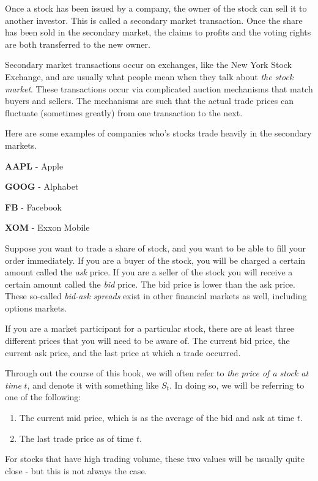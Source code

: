 \documentclass[11pt,]{krantz}
\begin{document}
Once a stock has been issued by a company, the owner of the stock can sell it to another investor. This is called a secondary market transaction. Once the share has been sold in the secondary market, the claims to profits and the voting rights are both transferred to the new owner.

Secondary market transactions occur on exchanges, like the New York Stock Exchange, and are usually what people mean when they talk about \emph{the stock market}. These transactions occur via complicated auction mechanisms that match buyers and sellers. The mechanisms are such that the actual trade prices can fluctuate (sometimes greatly) from one transaction to the next.

Here are some examples of companies who's stocks trade heavily in the secondary markets.

\textbf{AAPL} - Apple

\textbf{GOOG} - Alphabet

\textbf{FB} - Facebook

\textbf{XOM} - Exxon Mobile

Suppose you want to trade a share of stock, and you want to be able to fill your order immediately. If you are a buyer of the stock, you will be charged a certain amount called the \emph{ask} price. If you are a seller of the stock you will receive a certain amount called the \emph{bid} price. The bid price is lower than the ask price. These so-called \emph{bid-ask spreads} exist in other financial markets as well, including options markets.

If you are a market participant for a particular stock, there are at least three different prices that you will need to be aware of. The current bid price, the current ask price, and the last price at which a trade occurred.

Through out the course of this book, we will often refer to \emph{the price of a stock at time} \(t\), and denote it with something like \(S_{t}\). In doing so, we will be referring to one of the following:

\begin{enumerate}
\def\labelenumi{\arabic{enumi}.}
\item
  The current mid price, which is as the average of the bid and ask at time \(t\).
\item
  The last trade price as of time \(t\).
\end{enumerate}

For stocks that have high trading volume, these two values will be usually quite close - but this is not always the case.
\end{document}
